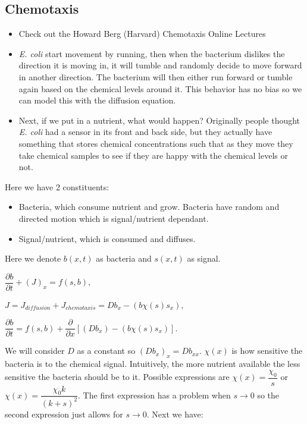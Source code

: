 \documentclass[]{article}
\numberwithin{equation}{section}		%
\begin{document}
\subsection{Chemotaxis}
\begin{itemize}
\item Check out the Howard Berg (Harvard) Chemotaxis Online Lectures
\item \textit{E. coli} start movement by running, then when the bacterium dislikes the direction it is moving in, it will tumble and randomly decide to move forward in another direction. The bacterium will then either run forward or tumble again based on the chemical levels around it. This behavior has no bias so we can model this with the diffusion equation.
\item Next, if we put in a nutrient, what would happen? Originally people thought \textit{E. coli} had a sensor in its front and back side, but they actually have something that stores chemical concentrations such that as they move they take chemical samples to see if they are happy with the chemical levels or not.
\end{itemize}
Here we have 2 constituents:
\begin{itemize}
	\item Bacteria, which consume nutrient and grow. Bacteria have random and directed motion which is signal/nutrient dependant.
	\item Signal/nutrient, which is consumed and diffuses.
\end{itemize}

Here we denote $b(x,t)$ as bacteria and $s(x,t)$ as signal.
\begin{center}
$\dfrac{\partial b}{\partial t} + (J)_{x}=f(s,b),$
\end{center}
\begin{center}
$J=J_{diffusion}+J_{chemotaxis}=Db_x-(b\chi(s)s_x),$
\end{center}
\begin{center}
$\dfrac{\partial b}{\partial t}=f(s,b)+\dfrac{\partial }{\partial x}[(Db_{x})-(b\chi(s)s_{x})].$
\end{center}

We will consider $D$ as a constant so $(Db_{x})_{x}=Db_{xx}$. $\chi(x)$ is how sensitive the bacteria is to the chemical signal. Intuitively, the more nutrient available the less sensitive the bacteria should be to it. Possible expressions are $\chi(x) = \dfrac{\chi_{0}}{s}$ or $\chi(x)=\dfrac{\chi_{0}k}{(k+s)^{2}}$. The first expression has a problem when $s\rightarrow0$ so the second expression just allows for $s \rightarrow 0$. Next we have:
\end{document}
